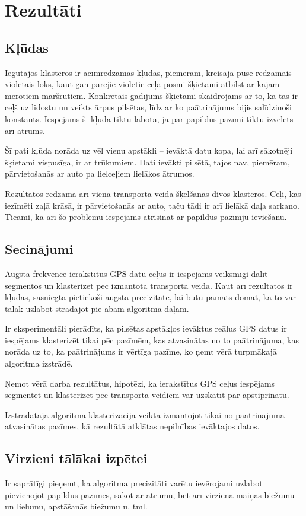 \documentclass{ludis}
\begin{document}
\chapter{Rezultāti}
\section{Kļūdas}
Iegūtajos klasteros ir acīmredzamas kļūdas, piemēram, kreisajā pusē redzamais violetais loks, kaut
gan pārējie violetie ceļa posmi šķietami atbilst ar kājām mērotiem maršrutiem. Konkrētais gadījums
šķietami skaidrojams ar to, ka tas ir ceļš uz lidostu un veikts ārpus pilsētas, līdz ar ko
paātrinājums bijis salīdzinoši konstants. Iespējams šī kļūda tiktu labota, ja par papildus pazīmi
tiktu izvēlēts arī ātrums.

Šī pati kļūda norāda uz vēl vienu apstākli -- ievāktā datu kopa, lai arī sākotnēji šķietami 
vispusīga, ir ar trūkumiem. Dati ievākti pilsētā, tajos nav, piemēram, pārvietošanās ar auto
pa lielceļiem lielākos ātrumos. 

Rezultātos redzama arī viena transporta veida šķelšanās divos klasteros. Ceļi, kas iezīmēti zaļā
krāsā, ir pārvietošanās ar auto, taču tādi ir arī lielākā daļa sarkano. Ticami, ka arī šo
problēmu iespējams atrisināt ar papildus pazīmju ieviešanu. 

\section{Secinājumi}
Augstā frekvencē ierakstītus GPS datu ceļus ir iespējams veiksmīgi dalīt segmentos un klasterizēt
pēc izmantotā transporta veida. Kaut arī rezultātos ir kļūdas, sasniegta pietiekoši augsta
precizitāte, lai būtu pamats domāt, ka to var tālāk uzlabot strādājot pie abām algoritma
daļām.

Ir eksperimentāli pierādīts, ka pilsētas apstākļos ievāktus reālus GPS datus ir iespējams
klasterizēt tikai pēc pazīmēm, kas atvasinātas no to paātrinājuma, kas norāda uz to, ka paātrinājums
ir vērtīga pazīme, ko ņemt vērā turpmākajā algoritma izstrādē.

Ņemot vērā darba rezultātus, hipotēzi, ka ierakstītus GPS ceļus iespējams segmentēt un klasterizēt
pēc transporta veidiem var uzskatīt par apstiprinātu.

Izstrādātajā algoritmā klasterizācija veikta izmantojot tikai no paātrinājuma atvasinātas pazīmes,
kā rezultātā atklātas nepilnības ievāktajos datos.

\section{Virzieni tālākai izpētei}
Ir saprātīgi pieņemt, ka algoritma precizitāti varētu ievērojami uzlabot pievienojot papildus
pazīmes, sākot ar ātrumu, bet arī virziena maiņas biežumu un lielumu, apstāšanās biežumu u. tml.
\end{document}
